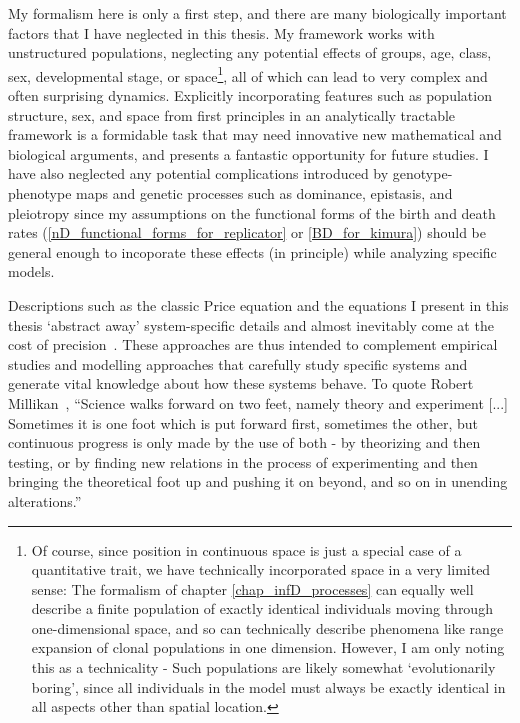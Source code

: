 My formalism here is only a first step, and there are many biologically important factors that I have neglected in this thesis. My framework works with unstructured populations, neglecting any potential effects of groups, age, class, sex, developmental stage, or space\footnote{Of course,  since position in continuous space is just a special case of a quantitative trait, we have technically incorporated space in a very limited sense: The formalism of chapter \ref{chap_infD_processes} can equally well describe a finite population of exactly identical individuals moving through one-dimensional space, and so can technically describe phenomena like range expansion of clonal populations in one dimension. However, I am only noting this as a technicality - Such populations are likely somewhat `evolutionarily boring', since all individuals in the model must always be exactly identical in all aspects other than spatial location.}, all of which can lead to very complex and often surprising dynamics. Explicitly incorporating features such as population structure, sex, and space from first principles in an analytically tractable framework is a formidable task that may need innovative new mathematical and biological arguments, and presents a fantastic opportunity for future studies. I have also neglected any potential complications introduced by genotype-phenotype maps and genetic processes such as dominance, epistasis, and pleiotropy since my assumptions on the functional forms of the birth and death rates (\eqref{nD_functional_forms_for_replicator} or \eqref{BD_for_kimura}) should be general enough to incoporate these effects (in principle) while analyzing specific models.

Descriptions such as the classic Price equation and the equations I present in this thesis `abstract away' system-specific details and almost inevitably come at the cost of precision~\citep{levins_strategy_1966, potochnik_idealization_2018}. These approaches are thus intended to complement empirical studies and modelling approaches that carefully study specific systems and generate vital knowledge about how these systems behave. To quote Robert Millikan~\citep{millikan_electron_1924}, ``Science walks forward on two feet, namely theory and experiment [...] Sometimes it is one foot which is put forward first, sometimes the other, but continuous progress is only made by the use of both - by theorizing and then testing, or by finding new relations in the process of experimenting and then bringing the theoretical foot up and pushing it on beyond, and so on in unending alterations.''